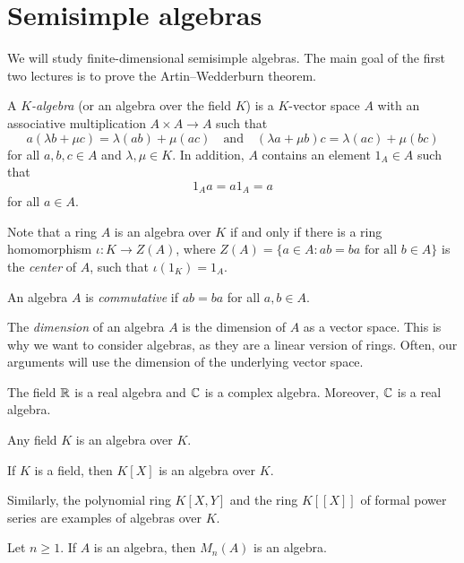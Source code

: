 \section{Semisimple algebras}
\lecture\label{lec:semisimple}

We will study finite-dimensional semisimple algebras. The main goal of the
first two lectures is to prove the Artin--Wedderburn theorem. 

\begin{definition}
	A \emph{$K$-algebra} (or an algebra over the field $K$) is a $K$-vector space $A$ 
	with an associative multiplication $A\times A\to A$ such that
	\[
    a(\lambda b+\mu c)=\lambda(ab)+\mu(ac)\quad\text{and}\quad 
	(\lambda a+\mu b)c=\lambda(ac)+\mu (bc)
 \]
    for all $a,b,c\in A$ and $\lambda,\mu\in K$. In addition, $A$ 
	contains an element $1_A\in A$ such that 
 \[
 1_Aa=a1_A=a
 \]
 for all $a\in A$.
 \end{definition}

Note that a ring $A$ is an algebra over $K$ if and only if there is a ring
homomorphism $\iota\colon K\to Z(A)$, where $Z(A)=\{a\in A:ab=ba\text{ for all $b\in A$}\}$
is the \emph{center} of $A$, such that $\iota(1_K)=1_A$. 

\begin{definition}
	An algebra $A$ is \emph{commutative} if $ab=ba$ for all $a,b\in A$. 
\end{definition}

The \emph{dimension} of an algebra $A$ is the dimension of $A$ as a vector space. This is why we want to consider algebras, as 
they are a linear version of rings. Often, our arguments will use the dimension of the underlying vector space.  

\begin{example}
	The field $\mathbb{R}$ is a real algebra and  
	$\mathbb{C}$ is a complex algebra. Moreover, $\mathbb{C}$ is a real algebra. 
\end{example}

Any field $K$ is an algebra over $K$.

\begin{example}
	If $K$ is a field, then $K[X]$ is an algebra over $K$. 
\end{example}

Similarly, the polynomial ring $K[X,Y]$ and the ring $K[\![X]\!]$ of formal
power series are examples of algebras over $K$. 

\begin{example}
	Let $n\geq1$. If $A$ is an algebra, then  $M_n(A)$ is an algebra. 
\end{example}

